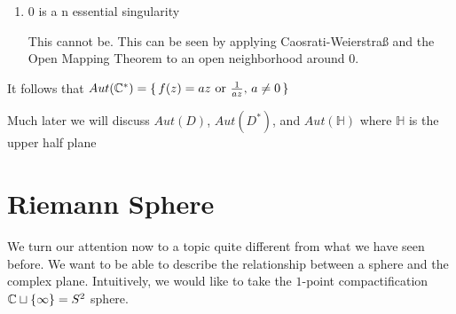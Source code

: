 \begin{example}[$Aut(\C^*)$]
\begin{enumerate}
    \item $0$ is a n essential singularity
    
    This cannot be. This can be seen by applying Caosrati-Weierstra{\ss} and the Open Mapping Theorem to an open neighborhood around $0$.
    
\end{enumerate}

It follows that $Aut(\mathbb{C}^*) = \set{ f(z) = az \text{ or } \frac{1}{az}, \, a \neq 0}$


\end{example}


Much later we will discuss $Aut(D)$, $Aut(D^*)$, and $Aut(\mathbb{H})$ where $\mathbb{H}$ is the upper half plane


\section{Riemann Sphere}

We turn our attention now to a topic quite different from what we have seen before. We want to be able to describe the relationship between a sphere and the complex plane. Intuitively, we would like to take the $1$-point compactification $\mathbb{C} \sqcup \{ \infty \} = S^2$ sphere.





